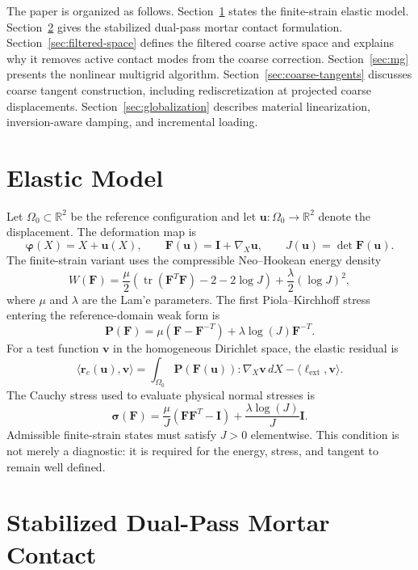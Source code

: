 \documentclass[11pt]{article}
\newcommand{\R}{\mathbb{R}}
\newcommand{\ud}{\boldsymbol{u}}
\newcommand{\vv}{\boldsymbol{v}}
\newcommand{\rr}{\boldsymbol{r}}
\newcommand{\II}{\boldsymbol{I}}
\newcommand{\FF}{\boldsymbol{F}}
\newcommand{\SSig}{\boldsymbol{\sigma}}
\newcommand{\Pio}{\boldsymbol{P}}
\newcommand{\JJ}{J}
\newcommand{\tr}{\operatorname{tr}}
\begin{document}
The paper is organized as follows.  Section~\ref{sec:model} states the
finite-strain elastic model.  Section~\ref{sec:sp-contact} gives the
stabilized dual-pass mortar contact formulation.  Section~\ref{sec:filtered-space}
defines the filtered coarse active space and explains why it removes active
contact modes from the coarse correction.  Section~\ref{sec:mg} presents the
nonlinear multigrid algorithm.  Section~\ref{sec:coarse-tangents} discusses
coarse tangent construction, including rediscretization at projected coarse
displacements.  Section~\ref{sec:globalization} describes material
linearization, inversion-aware damping, and incremental loading.

\section{Elastic Model}
\label{sec:model}

Let $\Omega_0\subset\R^2$ be the reference configuration and let
$\ud:\Omega_0\to\R^2$ denote the displacement.  The deformation map is
\[
    \boldsymbol{\varphi}(X)=X+\ud(X),
    \qquad
    \FF(\ud)=\II+\nabla_X\ud,
    \qquad
    \JJ(\ud)=\det\FF(\ud).
\]
The finite-strain variant uses the compressible Neo--Hookean energy density
\[
    W(\FF)
    =
    \frac{\mu}{2}
    \left(
        \tr(\FF^T\FF)-2-2\log\JJ
    \right)
    +
    \frac{\lambda}{2}
    \left(\log\JJ\right)^2 ,
\]
where $\mu$ and $\lambda$ are the Lam'e parameters.  The first
Piola--Kirchhoff stress entering the reference-domain weak form is
\[
    \Pio(\FF)
    =
    \mu(\FF-\FF^{-T})
    +
    \lambda\log(\JJ)\FF^{-T}.
\]
For a test function $\vv$ in the homogeneous Dirichlet space, the elastic
residual is
\[
    \langle \rr_e(\ud),\vv\rangle
    =
    \int_{\Omega_0}
    \Pio(\FF(\ud)):\nabla_X\vv\,dX
    -
    \langle \ell_{\mathrm{ext}},\vv\rangle .
\]
The Cauchy stress used to evaluate physical normal stresses is
\[
    \SSig(\FF)
    =
    \frac{\mu}{\JJ}
    \left(\FF\FF^T-\II\right)
    +
    \frac{\lambda\log(\JJ)}{\JJ}\II .
\]
Admissible finite-strain states must satisfy $\JJ>0$ elementwise.  This
condition is not merely a diagnostic: it is required for the energy, stress,
and tangent to remain well defined.

\section{Stabilized Dual-Pass Mortar Contact}
\label{sec:sp-contact}
\end{document}
